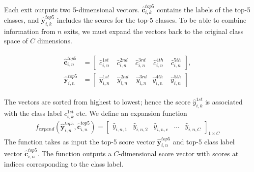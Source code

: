 Each exit outputs two 5-dimensional vectors. $\bm{\hat{c}}_{i,k}^{top5}$ contains the labels of the top-5 classes, and $ \bm{\hat{y}}_{i,k}^{top5}$ includes the scores for the top-5 classes. To be able to combine information from $ n $ exits, we must expand the vectors back to the original class space of $ C $ dimensions.

\begin{align}
\begin{split}
\bm{\hat{c}}_{i,n}^{top5} &= \begin{bmatrix}
\hat{c}_{i,n}^{1st} & \phantom{.}\hat{c}_{i,n}^{2nd} & \phantom{.}\hat{c}_{i,n}^{3rd} & \phantom{.}\hat{c}_{i,n}^{4th} & \phantom{.}\hat{c}_{i,n}^{5th}
\end{bmatrix}, \\
\bm{\hat{y}}^{top5}_{i,n} &= \begin{bmatrix}
\hat{y}_{i,n}^{1st} & \phantom{.}\hat{y}_{i,n}^{2nd} & \phantom{.}\hat{y}_{i,n}^{3rd} & \hat{y}_{i,n}^{4th} & \phantom{.}\hat{y}_{i,n}^{5th}
\end{bmatrix}
\end{split}
\end{align}

The vectors are sorted from highest to lowest; hence the score $ \hat{y}_{i,k}^{1st} $ is associated with the class label $ c_{i,k}^{1st} $ etc. 
We define an expansion function 
\begin{align}
f_{expand}\left(\bm{\hat{y}}_{i,n}^{top5},\bm{\hat{c}}_{i,n}^{top5}\right) = 
\begin{bmatrix}
\hat{y}_{i,n,1} & \hat{y}_{i,n,2} & \hat{y}_{i,n,c} & \dots & \hat{y}_{i,n,C}
\end{bmatrix}_{1 \times C}
\end{align}
The function takes as input the top-5 score vector $ \bm{\hat{y}}_{i,n}^{top5}$ and top-5 class label vector  $\bm{\hat{c}}_{i,n}^{top5}$. The function outputs a $ C $-dimensional score vector with scores at indices corresponding to the class label. 

